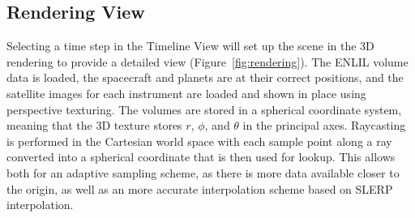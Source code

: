 \documentclass{vgtc}                          %
\begin{document}
\subsection{Rendering View} \label{sec:rendering}
Selecting a time step in the Timeline View will set up the scene in the 3D rendering to provide a detailed view (Figure~\ref{fig:rendering}). The ENLIL volume data is loaded, the spacecraft and planets are at their correct positions, and the satellite images for each instrument are loaded and shown in place using perspective texturing. The volumes are stored in a spherical coordinate system, meaning that the 3D texture stores $r$, $\phi$, and $\theta$ in the principal axes. Raycasting is performed in the Cartesian world space with each sample point along a ray converted into a spherical coordinate that is then used for lookup. This allows both for an adaptive sampling scheme, as there is more data available closer to the origin, as well as an more accurate interpolation scheme based on SLERP interpolation.



\end{document}
